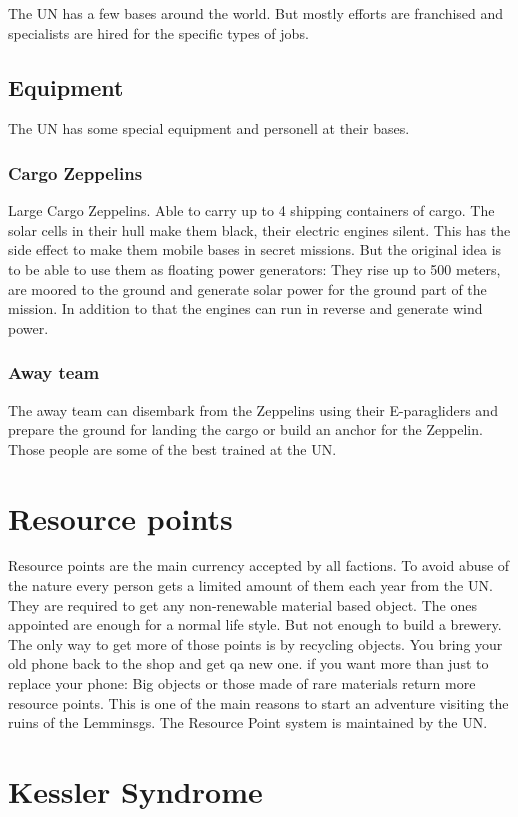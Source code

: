 The UN has a few bases around the world. But mostly efforts are franchised and specialists are hired for the specific types of jobs.

\subsection{Equipment}

The UN has some special equipment and personell at their bases.

\subsubsection{Cargo Zeppelins}
\label{sec: UN Cargo Zeppelins}
Large Cargo Zeppelins. Able to carry up to 4 shipping containers of cargo. The solar cells in their hull make them black, their electric engines silent. This has the side effect to make them mobile bases in secret missions. But the original idea is to be able to use them as floating power generators: They rise up to 500 meters, are moored to the ground and generate solar power for the ground part of the mission. In addition to that the engines can run in reverse and generate wind power.

\subsubsection{Away team}
\label{sec: UN away team}
The away team can disembark from the Zeppelins using their E-paragliders and prepare the ground for landing the cargo or build an anchor for the Zeppelin. Those people are some of the best trained at the UN.


\section{Resource points}
\label{sec:Resource Points}
Resource points are the main currency accepted by all factions. To avoid abuse of the nature every person gets a limited amount of them each year from the UN. They are required to get any non-renewable material based object. The ones appointed are enough for a normal life style. But not enough to build a brewery. The only way to get more of those points is by recycling objects. You bring your old phone back to the shop and get qa new one. if you want more than just to replace your phone: Big objects or those made of rare materials return more resource points. This is one of the main reasons to start an adventure visiting the ruins of the Lemminsgs. The Resource Point system is maintained by the UN. 



\section{Kessler Syndrome}
\label{sec: Kessler Syndrome}